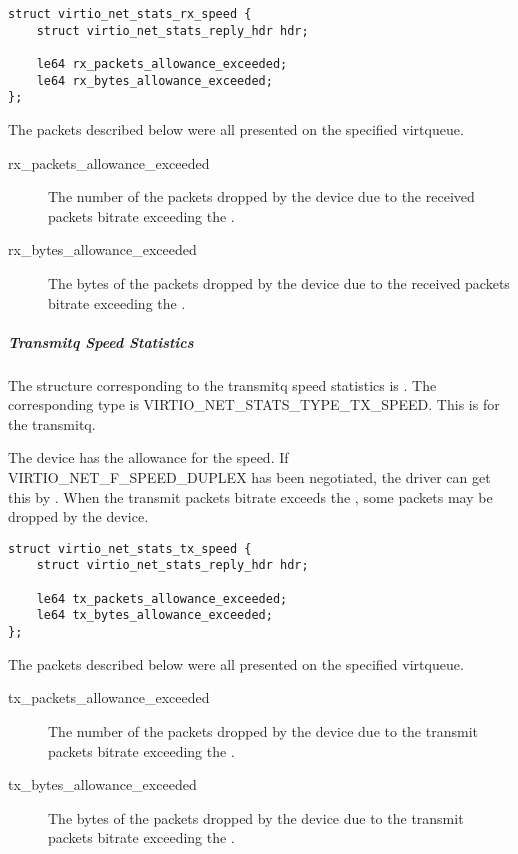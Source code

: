 \begin{lstlisting}
struct virtio_net_stats_rx_speed {
    struct virtio_net_stats_reply_hdr hdr;

    le64 rx_packets_allowance_exceeded;
    le64 rx_bytes_allowance_exceeded;
};
\end{lstlisting}

The packets described below were all presented on the specified virtqueue.
\begin{description}
    \item [rx_packets_allowance_exceeded]
        The number of the packets dropped by the device due to the received
        packets bitrate exceeding the .

    \item [rx_bytes_allowance_exceeded]
        The bytes of the packets dropped by the device due to the received
        packets bitrate exceeding the .

\end{description}

\subparagraph{Transmitq Speed Statistics}\label{sec:Device Types / Network Device / Device Operation / Control Virtqueue / Device Statistics / Transmitq Speed Statistics}

The structure corresponding to the transmitq speed statistics is
. The corresponding type is
VIRTIO_NET_STATS_TYPE_TX_SPEED. This is for the transmitq.

The device has the allowance for the speed. If VIRTIO_NET_F_SPEED_DUPLEX has
been negotiated, the driver can get this by . When the transmit
packets bitrate exceeds the , some packets may be dropped by the
device.

\begin{lstlisting}
struct virtio_net_stats_tx_speed {
    struct virtio_net_stats_reply_hdr hdr;

    le64 tx_packets_allowance_exceeded;
    le64 tx_bytes_allowance_exceeded;
};
\end{lstlisting}

The packets described below were all presented on the specified virtqueue.
\begin{description}
    \item [tx_packets_allowance_exceeded]
        The number of the packets dropped by the device due to the transmit packets
        bitrate exceeding the .

    \item [tx_bytes_allowance_exceeded]
        The bytes of the packets dropped by the device due to the transmit packets
        bitrate exceeding the .

\end{description}

